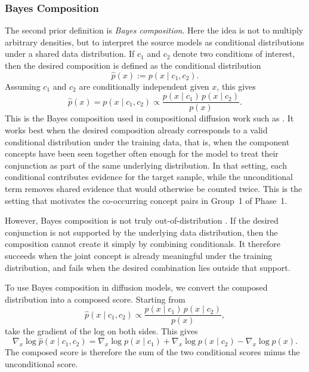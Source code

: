 \subsubsection{Bayes Composition}

The second prior definition is \emph{Bayes composition}. Here the idea is not to multiply
arbitrary densities, but to interpret the source models as conditional distributions under a
shared data distribution. If \(c_1\) and \(c_2\) denote two conditions of interest, then
the desired composition is defined as the conditional distribution
\[
    \hat p(x) := p(x \mid c_1, c_2).
\]
Assuming \(c_1\) and \(c_2\) are conditionally independent given \(x\), this gives
\begin{equation}
    \hat p(x)
    = p(x \mid c_1, c_2)
    \propto \frac{p(x \mid c_1)\,p(x \mid c_2)}{p(x)}.
    \label{eq:poe_dist}
\end{equation}
This is the Bayes composition used in compositional diffusion work such as
\citep{liu2022compositional,du2023reduce,du2024compositional,NEURIPS2020_49856ed4}.
It works best when the desired composition already corresponds to a valid conditional distribution under the
training data, that is, when the component concepts have been seen together often enough
for the model to treat their conjunction as part of the same underlying distribution. In
that setting, each conditional contributes evidence for the target sample, while the
unconditional term removes shared evidence that would otherwise be counted twice. This is
the setting that motivates the co-occurring concept pairs in Group~1 of Phase~1.

However, Bayes composition is not truly out-of-distribution \citep{mechanisms2025projective}. 
If the desired conjunction is not supported by the underlying data distribution, then the composition cannot create it
simply by combining conditionals. It therefore succeeds when the
joint concept is already meaningful under the training distribution, and fails when the
desired combination lies outside that support.

To use Bayes composition in diffusion models, we convert the composed distribution into a
composed score. Starting from
\[
    \hat p(x \mid c_1, c_2)
    \propto
    \frac{p(x \mid c_1)\,p(x \mid c_2)}{p(x)},
\]
take the gradient of the log on both sides. This gives
\begin{equation}
    \nabla_x \log \hat p(x \mid c_1, c_2)
    =
    \nabla_x \log p(x \mid c_1)
    +
    \nabla_x \log p(x \mid c_2)
    -
    \nabla_x \log p(x).
    \label{eq:poe_score}
\end{equation}
The composed score is therefore the sum of the two conditional scores minus the
unconditional score.

